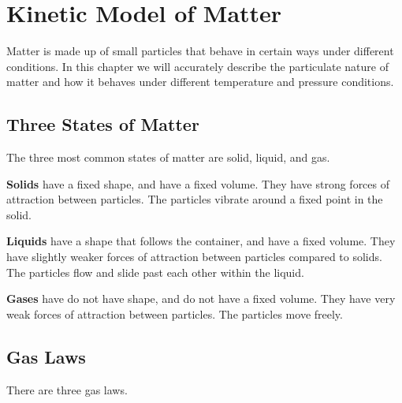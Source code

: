 \documentclass[../main.tex]{subfiles}
\begin{document}
	\section{Kinetic Model of Matter}
	
	\begin{preamb}
		Matter is made up of small particles that behave in certain ways under different conditions. In this chapter we will accurately describe the particulate nature of matter and how it behaves under different temperature and pressure conditions.
	\end{preamb}
	
	\subsection{Three States of Matter}
	The three most common states of matter are solid, liquid, and gas. 
	
	\textbf{Solids} have a fixed shape, and have a fixed volume. They have strong forces of attraction between particles. The particles vibrate around a fixed point in the solid.
	
	\textbf{Liquids} have a shape that follows the container, and have a fixed volume. They have slightly weaker forces of attraction between particles compared to solids. The particles flow and slide past each other within the liquid.
	
	\textbf{Gases} have do not have shape, and do not have a fixed volume. They have very weak forces of attraction between particles. The particles move freely.
	
	
	\subsection{Gas Laws}
	There are three gas laws. 
	
	
		\begin{center}
		\end{center}
	
\end{document}
